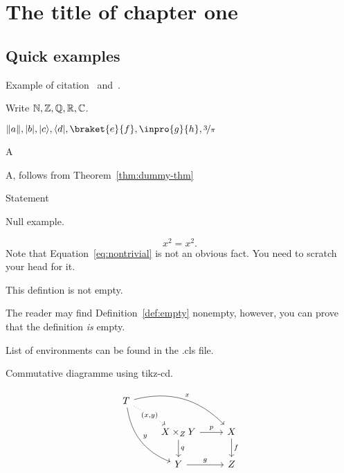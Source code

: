 
\chapter{The title of chapter one}


\section{Quick examples}

Example of citation~\cite{dummy-1} and~\cite{dummy-2}.


Write \(\mathbb{N},\mathbb{Z},\mathbb{Q},\mathbb{R},\mathbb{C}\).

\(\norm{a}, \abs{b}, \ket{c}, \bra{d}, \braket{e}{f}, \inpro{g}{h}, \nicefrac{3}{\pi}\)

\begin{theorem}
  \label{thm:dummy-thm}
  A
\end{theorem}

\begin{theorem*}
  A, follows from Theorem~\ref{thm:dummy-thm}
\end{theorem*}

\begin{lemma}
  \label{lem:dummy}
  Statement
\end{lemma}


\begin{example}
  \label{exa:haha}
  Null example.
\end{example}

\begin{equation}
  \label{eq:nontrivial}
  x^2=x^2.
\end{equation}
Note that Equation~\eqref{eq:nontrivial} is not an obvious fact. You need to scratch your head for it.

\begin{definition}
  \label{def:empty}
  This defintion is not empty.
\end{definition}
\begin{remark}
  \label{rem:regarding-def}
  The reader may find Definition~\ref{def:empty} nonempty, however, you can prove that the definition \emph{is} empty.
\end{remark}

List of environments can be found in the .cls file.



Commutative diagramme using tikz-cd.

\[
  \begin{tikzcd}
  T
\arrow[drr, bend left, "x"]
\arrow[ddr, bend right, "y"]
\arrow[dr, dotted, "{(x,y)}" description] & & \\
& X \times_Z Y \arrow[r, "p"] \arrow[d, "q"] & X \arrow[d, "f"] \\
& Y \arrow[r, "g"] &Z
\end{tikzcd}
\]


